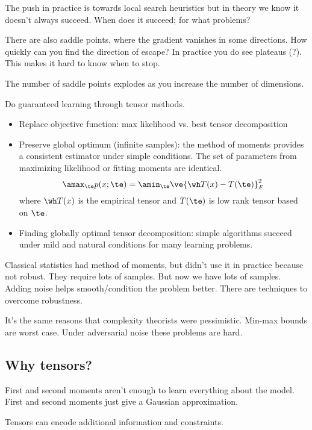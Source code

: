
The push in practice is towards local search heuristics but in theory we know it doesn't always succeed. When does it succeed; for what problems?

There are also saddle points, where the gradient vanishes in some directions. How quickly can you find the direction of escape? In practice you do see plateaus (?). 
This makes it hard to know when to stop.

The number of saddle points explodes as you increase the number of dimensions. 

Do guaranteed learning through tensor methods.
\begin{itemize}
\item
Replace objective function: max likelihood vs. best tensor decomposition
\item
Preserve global optimum (infinite samples): the method of moments provides a consistent estimator under simple conditions. The set of parameters from maximizing likelihood or fitting moments are identical.
$$
\amax_\te p(x;\te) = \amin_\te \ve{\wh T(x) - T(\te)}_F^2
$$
where $\wh T(x)$ is the empirical tensor and $T(\te)$ is low rank tensor based on $\te$.
\item
Finding globally optimal tensor decomposition: simple algorithms succeed under mild and natural conditions for many learning problems.
\end{itemize}

Classical statistics had method of moments, but didn't use it in practice because not robust. They require lots of samples. But now we have lots  of samples.
Adding noise helps smooth/condition the problem better. There are techniques to overcome robustness.

It's the same reasons that complexity theorists were pessimistic. Min-max bounds are worst case. Under adversarial noise these problems are hard.

\subsection{Why tensors?}

First and second moments aren't enough to learn everything about the model. First and second moments just give a Gaussian approximation. %

Tensors can encode additional information and constraints.

